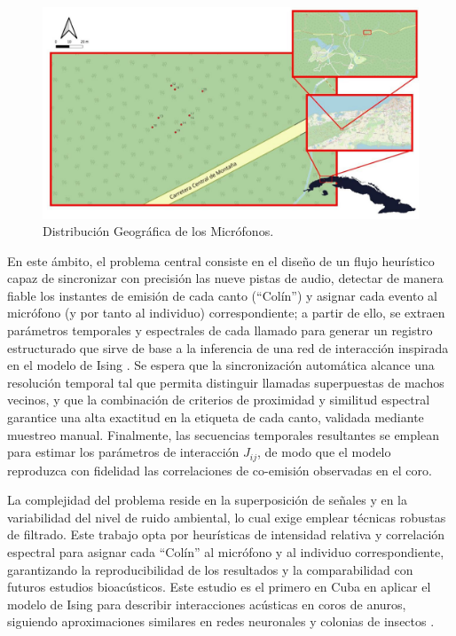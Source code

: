 \begin{figure}[h!]
    \centering
    \includegraphics[width=\columnwidth]{Graphics/mic_map.jpg}
    \caption{Distribución Geográfica de los Micrófonos.}
    \label{fig:map}
\end{figure}

En este ámbito, el problema central consiste en el diseño de 
un flujo heurístico 
capaz de sincronizar con precisión las nueve pistas de audio, 
detectar de manera fiable los instantes de emisión de cada 
canto (“Colín”) y asignar cada evento al micrófono (y por tanto 
al individuo) correspondiente; a partir de ello, se extraen 
parámetros temporales y espectrales de cada llamado para 
generar un registro estructurado que sirve de base a la 
inferencia de una red de interacción inspirada en el modelo de 
Ising \cite{ising1925beitrag}. Se espera que la sincronización 
automática alcance una resolución temporal tal que permita 
distinguir llamadas superpuestas de machos vecinos, y que la 
combinación de criterios de proximidad y similitud espectral 
garantice una alta exactitud en la etiqueta de cada canto, 
validada mediante muestreo manual. Finalmente, las secuencias 
temporales resultantes se emplean para estimar los parámetros 
de interacción \(J_{ij}\), de modo que el modelo reproduzca 
con fidelidad las correlaciones de co-emisión observadas en el 
coro.  


La complejidad del problema reside en la superposición de 
señales y en la variabilidad del nivel de ruido ambiental, lo 
cual exige emplear técnicas robustas de filtrado. 
Este trabajo opta por heurísticas 
de intensidad relativa y correlación espectral para asignar cada “Colín” al micrófono y 
al individuo correspondiente, garantizando 
la reproducibilidad de los resultados y la comparabilidad con 
futuros estudios bioacústicos. Este estudio es el primero en 
Cuba en aplicar el modelo de Ising para describir 
interacciones acústicas en coros de anuros, siguiendo 
aproximaciones similares en redes 
neuronales y colonias de insectos \cite{schneidman2006weak,mora2011biological,bialek2012biophysics,reyes2019transmission,ising1925beitrag}.

